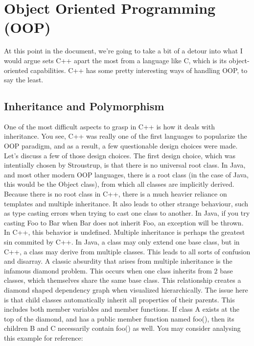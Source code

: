\documentclass{article}
\begin{document}
\section{Object Oriented Programming (OOP)}

At this point in the document, we're going to take a bit of a detour into what I would argue sets C++ apart
the most from a language like C, which is its object-oriented capabilities. C++ has some pretty interesting
ways of handling OOP, to say the least.

\subsection{Inheritance and Polymorphism}

One of the most difficult aspects to grasp in C++ is how it deals with inheritance. You see, C++ was really
one of the first languages to popularize the OOP paradigm, and as a result, a few questionable design choices
were made. Let's discuss a few of those design choices. The first design choice, which was intentially
chosen by Stroustrup, is that there is no universal root class. In Java, and most other modern OOP languages,
there is a root class (in the case of Java, this would be the Object class), from which all classes are
implicitly derived. Because there is no root class in C++, there is a much heavier reliance on templates and
multiple inheritance. It also leads to other strange behaviour, such as type casting errors when trying to cast
one class to another. In Java, if you try casting Foo to Bar when Bar does not inherit Foo, an exception will
be thrown. In C++, this behavior is undefined. Multiple inheritance is perhaps the greatest sin commited by
C++. In Java, a class may only extend one base class, but in C++, a class may derive from multiple classes.
This leads to all sorts of confusion and disarray. A classic absurdity that arises from multiple inheritance
is the infamous diamond problem. This occurs when one class inherits from 2 base classes, which themselves
share the same base class. This relationship creates a diamond shaped dependency graph when visualized
hierarchically. The issue here is that child classes automatically inherit all properties of their parents.
This includes both member variables and member functions. If class A exists at the top of the diamond, and has
a public member function named foo(), then its children B and C necessarily contain foo() as well. You may
consider analysing this example for reference:
\end{document}
